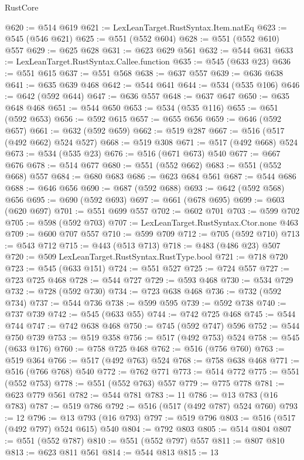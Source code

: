 \begin{lexlean}{RustCore}
\begin{coremodule}
@620 := @514 @619
@621 := LexLeanTarget.RustSyntax.Item.natEq
@623 := @545 (@546 @621)
@625 := @551 (@552 @604)
@628 := @551 (@552 @610) @557
@629 := @625 @628
@631 := @623 @629 @561
@632 := @544 @631
@633 := LexLeanTarget.RustSyntax.Callee.function
@635 := @545 (@633 @23)
@636 := @551 @615
@637 := @551 @568
@638 := @637 @557
@639 := @636 @638
@641 := @635 @639 @468
@642 := @544 @641
@644 := @534 (@535 @106)
@646 := @642 (@592 @644)
@647 := @636 @557
@648 := @637 @647
@650 := @635 @648 @468
@651 := @544 @650
@653 := @534 (@535 @116)
@655 := @651 (@592 @653)
@656 := @592 @615
@657 := @655 @656
@659 := @646 (@592 @657)
@661 := @632 (@592 @659)
@662 := @519 @287
@667 := @516 (@517 (@492 @662) @524 @527)
@668 := @519 @308
@671 := @517 (@492 @668) @524
@673 := @534 (@535 @23)
@676 := @516 (@671 @673) @540
@677 := @667 @676
@678 := @514 @677
@680 := @551 (@552 @662)
@683 := @551 (@552 @668) @557
@684 := @680 @683
@686 := @623 @684 @561
@687 := @544 @686
@688 := @646 @656
@690 := @687 (@592 @688)
@693 := @642 (@592 @568) @656
@695 := @690 (@592 @693)
@697 := @661 (@678 @695)
@699 := @603 (@620 @697)
@701 := @551 @699 @557
@702 := @602 @701
@703 := @599 @702
@705 := @598 (@592 @703)
@707 := LexLeanTarget.RustSyntax.Ctor.none @463
@709 := @600 @707 @557
@710 := @599 @709
@712 := @705 (@592 @710)
@713 := @543 @712
@715 := @443 (@513 @713)
@718 := @483 (@486 @23) @507
@720 := @509 LexLeanTarget.RustSyntax.RustType.bool
@721 := @718 @720
@723 := @545 (@633 @151)
@724 := @551 @527
@725 := @724 @557
@727 := @723 @725 @468
@728 := @544 @727
@729 := @593 @468
@730 := @534 @729
@732 := @728 (@592 @730)
@734 := @723 @638 @468
@736 := @732 (@592 @734)
@737 := @544 @736
@738 := @599 @595
@739 := @592 @738
@740 := @737 @739
@742 := @545 (@633 @55)
@744 := @742 @725 @468
@745 := @544 @744
@747 := @742 @638 @468
@750 := @745 (@592 @747) @596
@752 := @544 @750 @739
@753 := @519 @358
@756 := @517 (@492 @753) @524
@758 := @545 (@633 @176)
@760 := @758 @725 @468
@762 := @516 (@756 @760)
@763 := @519 @364
@766 := @517 (@492 @763) @524
@768 := @758 @638 @468
@771 := @516 (@766 @768) @540
@772 := @762 @771
@773 := @514 @772
@775 := @551 (@552 @753)
@778 := @551 (@552 @763) @557
@779 := @775 @778
@781 := @623 @779 @561
@782 := @544 @781
@783 := 11
@786 := @13 @783 (@16 @783)
@787 := @519 @786
@792 := @516 (@517 (@492 @787) @524 @760)
@793 := 12
@796 := @13 @793 (@16 @793)
@797 := @519 @796
@803 := @516 (@517 (@492 @797) @524 @615) @540
@804 := @792 @803
@805 := @514 @804
@807 := @551 (@552 @787)
@810 := @551 (@552 @797) @557
@811 := @807 @810
@813 := @623 @811 @561
@814 := @544 @813
@815 := 13

\end{coremodule}
\end{lexlean}
